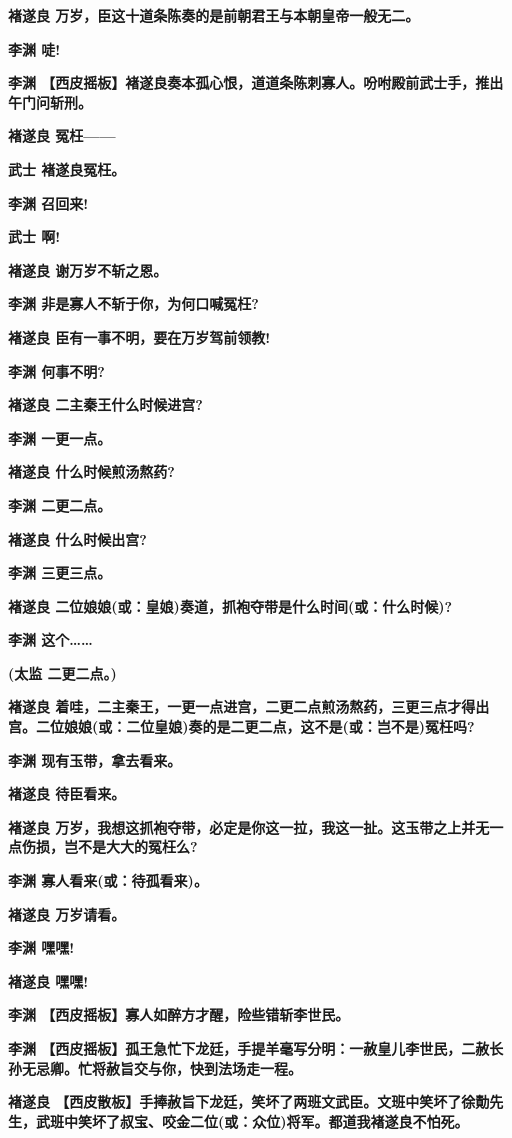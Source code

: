 \textbf{褚遂良 万岁，臣这十道条陈奏的是前朝君王与本朝皇帝一般无二。}

\textbf{李渊 唗!}

\textbf{李渊
【西皮摇板】褚遂良奏本孤心恨，道道条陈刺寡人。吩咐殿前武士手，推出午门问斩刑。}

\textbf{褚遂良 冤枉------}

\textbf{武士 褚遂良冤枉。}

\textbf{李渊 召回来!}

\textbf{武士 啊!}

\textbf{褚遂良 谢万岁不斩之恩。}

\textbf{李渊 非是寡人不斩于你，为何口喊冤枉?}

\textbf{褚遂良 臣有一事不明，要在万岁驾前领教!}

\textbf{李渊 何事不明?}

\textbf{褚遂良 二主秦王什么时候进宫?}

\textbf{李渊 一更一点。}

\textbf{褚遂良 什么时候煎汤熬药?}

\textbf{李渊 二更二点。}

\textbf{褚遂良 什么时候出宫?}

\textbf{李渊 三更三点。}

\textbf{褚遂良
二位娘娘(或：皇娘)奏道，抓袍夺带是什么时间(或：什么时候)?}

\textbf{李渊 这个\ldots{}\ldots{}}

\textbf{(太监 二更二点。)}

\textbf{褚遂良
着哇，二主秦王，一更一点进宫，二更二点煎汤熬药，三更三点才得出宫。二位娘娘(或：二位皇娘)奏的是二更二点，这不是(或：岂不是)冤枉吗?}

\textbf{李渊 现有玉带，拿去看来。}

\textbf{褚遂良 待臣看来。}

\textbf{褚遂良
万岁，我想这抓袍夺带，必定是你这一拉，我这一扯。这玉带之上并无一点伤损，岂不是大大的冤枉么?}

\textbf{李渊 寡人看来(或：待孤看来)。}

\textbf{褚遂良 万岁请看。}

\textbf{李渊 嘿嘿!}

\textbf{褚遂良 嘿嘿!}

\textbf{李渊 【西皮摇板】寡人如醉方才醒，险些错斩李世民。}

\textbf{李渊
【西皮摇板】孤王急忙下龙廷，手提羊毫写分明：一赦皇儿李世民，二赦长孙无忌卿。忙将赦旨交与你，快到法场走一程。}

\textbf{褚遂良
【西皮散板】手捧赦旨下龙廷，笑坏了两班文武臣。文班中笑坏了徐勣先生，武班中笑坏了叔宝、咬金二位(或：众位)将军。都道我褚遂良不怕死。}

